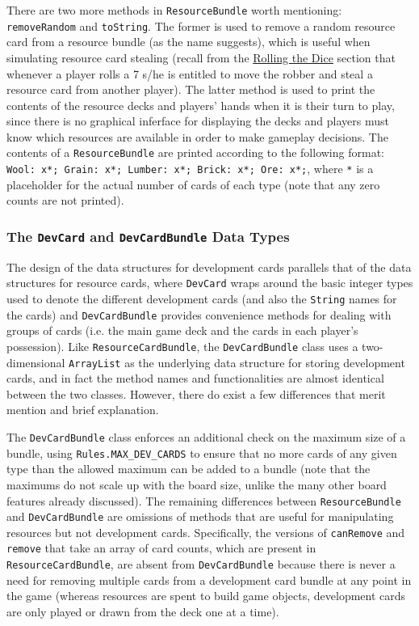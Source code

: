 \documentclass[pageno]{jpaper}
\begin{document}
\begin{doublespacing}
There are two more methods in \lstinline$ResourceBundle$ worth mentioning: \lstinline$removeRandom$ and \lstinline$toString$. The former is used to remove a random resource card from a resource bundle (as the name suggests), which is useful when simulating resource card stealing (recall from the \hyperlink{sec:rolling_the_dice}{Rolling the Dice} section that whenever a player rolls a 7 s/he is entitled to move the robber and steal a resource card from another player). The latter method is used to print the contents of the resource decks and players' hands when it is their turn to play, since there is no graphical inferface for displaying the decks and players must know which resources are available in order to make gameplay decisions. The contents of a \lstinline$ResourceBundle$ are printed according to the following format: \lstinline$Wool: x*; Grain: x*; Lumber: x*; Brick: x*; Ore: x*;$, where \lstinline$*$ is a placeholder for the actual number of cards of each type (note that any zero counts are not printed).

\hypertarget{sec:the_devcard_and_devcardbundle_data_types}{}
\subsubsection{The \lstinline$DevCard$ and \lstinline$DevCardBundle$ Data Types}

The design of the data structures for development cards parallels that of the data structures for resource cards, where \lstinline$DevCard$ wraps around the basic integer types used to denote the different development cards (and also the \lstinline$String$ names for the cards) and \lstinline$DevCardBundle$ provides convenience methods for dealing with groups of cards (i.e. the main game deck and the cards in each player's possession). Like \lstinline$ResourceCardBundle$, the \lstinline$DevCardBundle$ class uses a two-dimensional \lstinline$ArrayList$ as the underlying data structure for storing development cards, and in fact the method names and functionalities are almost identical between the two classes. However, there do exist a few differences that merit mention and brief explanation.

The \lstinline$DevCardBundle$ class enforces an additional check on the maximum size of a bundle, using \lstinline$Rules.MAX_DEV_CARDS$ to ensure that no more cards of any given type than the allowed maximum can be added to a bundle (note that the maximums do not scale up with the board size, unlike the many other board features already discussed). The remaining differences between \lstinline$ResourceBundle$ and \lstinline$DevCardBundle$ are omissions of methods that are useful for manipulating resources but not development cards. Specifically, the versions of \lstinline$canRemove$ and \lstinline$remove$ that take an array of card counts, which are present in \lstinline$ResourceCardBundle$, are absent from \lstinline$DevCardBundle$ because there is never a need for removing multiple cards from a development card bundle at any point in the game (whereas resources are spent to build game objects, development cards are only played or drawn from the deck one at a time).


\end{doublespacing}
\end{document}
